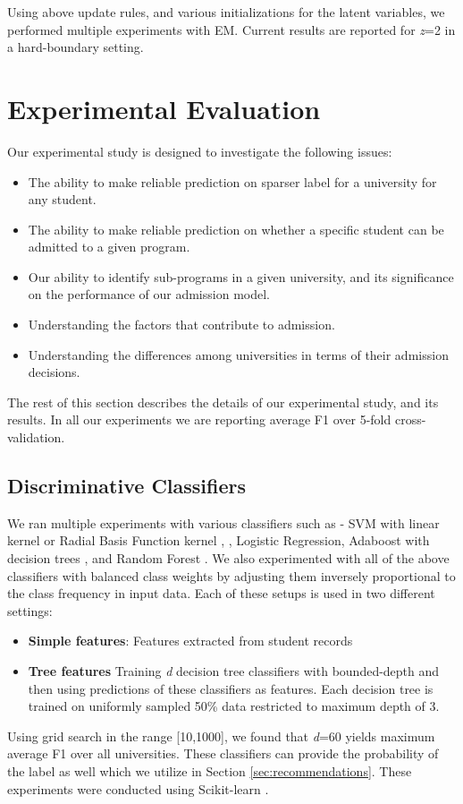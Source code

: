 \documentclass{sig-alternate-05-2015}
\begin{document}
Using above update rules, and various initializations for the latent variables, we performed multiple experiments with EM. Current results are reported for \textit{z}=2 in a hard-boundary setting.


\section{Experimental Evaluation}
\label{sec:experiments}
Our experimental study is designed to investigate the following issues:
\begin{itemize}
\item The ability to make reliable prediction on sparser label for a university for any student.
\item The ability to make reliable prediction on whether a specific student can be admitted to a given program.
\item Our ability to identify sub-programs in a given university, and its significance on the performance of our admission model.
\item Understanding the factors that contribute to admission.
\item Understanding the differences among universities in terms of their admission decisions.
\end{itemize}
The rest of this section describes the details of our experimental study, and its results. In all our experiments we are reporting average F1 over 5-fold cross-validation.

\subsection{Discriminative Classifiers}
\label{subsec:supervised-exp}
We ran multiple experiments with various classifiers such as - SVM with linear kernel or Radial Basis Function kernel \cite{libsvm}, \cite{svmtutorial}, Logistic Regression, Adaboost \cite{adaboost} with decision trees \cite{decisiontree}, and Random Forest \cite{randomforest}. We also experimented with all of the above classifiers with balanced class weights by adjusting them inversely proportional to the class frequency in input data. Each of these setups is used in two different settings:
\begin{itemize}
\item \textbf{Simple features}: Features extracted from student records
\item \textbf{Tree features} Training \textit{d} decision tree classifiers with bounded-depth and then using predictions of these classifiers as features. Each decision tree is trained on uniformly sampled 50\% data restricted to maximum depth of 3.
\end{itemize}
Using grid search in the range [10,1000], we found that \textit{d}=60 yields maximum average F1 over all universities. These classifiers can provide the probability of the label as well which we utilize in Section \ref{sec:recommendations}. These experiments were conducted using Scikit-learn \cite{scikit-learn}.
\end{document}

